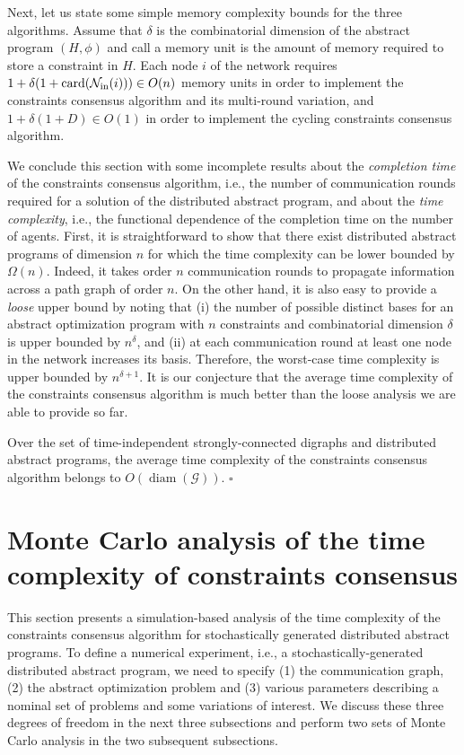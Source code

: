 \documentclass[onecolumn,journal,letterpaper]{IEEEtran}
\newcommand{\subscr}[2]{{#1}_{\textup{#2}}}
\newcommand{\diam}{\operatorname{diam}}
\newcommand{\GG}{\mathcal{G}}
\newcommand{\card}{\ensuremath{\operatorname{card}}}
\newcommand{\innbrs}{\subscr{\mathcal{N}}{in}}
\newcommand\oprocendsymbol{\hbox{$\square$}}
\newcommand\oprocend{\relax\ifmmode\else\unskip\hfill\fi\oprocendsymbol}
\begin{document}
Next, let us state some simple memory complexity bounds for the three
algorithms.  Assume that $\delta$ is the combinatorial dimension of the
abstract program $(H, \phi)$ and call a memory unit is the amount of
memory required to store a constraint in $H$.  Each node $i$ of the
network requires $1+\delta(1+\card(\innbrs(i)))\in O(n)$ memory units in
order to implement the constraints consensus algorithm and its multi-round
variation, and $1+\delta(1+D) \in O(1)$ in order to implement the cycling
constraints consensus algorithm.

We conclude this section with some incomplete results about the
\emph{completion time} of the constraints consensus algorithm, i.e., the
number of communication rounds required for a solution of the distributed
abstract program, and about the \emph{time complexity}, i.e., the
functional dependence of the completion time on the number of
agents. First, it is straightforward to show that there exist distributed
abstract programs of dimension $n$ for which the time complexity can
be lower bounded by $\Omega(n)$. Indeed, it takes order $n$ communication
rounds to propagate information across a path graph of order $n$.  On the
other hand, it is also easy to provide a \emph{loose} upper bound by noting
that (i) the number of possible distinct bases for an abstract optimization
program with $n$ constraints and combinatorial dimension $\delta$ is upper
bounded by $n^\delta$, and (ii) at each communication round at least one
node in the network increases its basis. Therefore, the worst-case time
complexity is upper bounded by $n^{\delta+1}$.  It is our conjecture that
the average time complexity of the constraints consensus algorithm is much
better than the loose analysis we are able to provide so far.

\begin{conjecture}
  \label{conjecture:linear}
  Over the set of time-independent strongly-connected digraphs and distributed
  abstract programs, the average time complexity of the constraints
  consensus algorithm belongs to $O(\diam(\GG))$. \oprocend
\end{conjecture}


\section{Monte Carlo analysis of the time complexity of constraints
  consensus}
\label{sec:computations}
This section presents a simulation-based analysis of the time complexity of
the constraints consensus algorithm for stochastically generated
distributed abstract programs.  To define a numerical experiment, i.e., a
stochastically-generated distributed abstract program, we need to specify
(1) the communication graph, (2) the abstract optimization problem and (3)
various parameters describing a nominal set of problems and some variations
of interest.  We discuss these three degrees of freedom in the next three
subsections and perform two sets of Monte Carlo analysis in the two
subsequent subsections.
\end{document}
